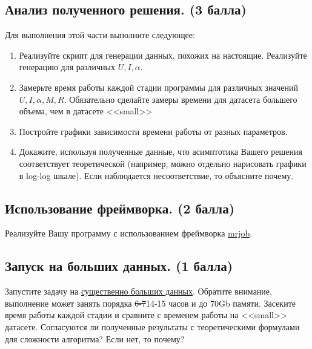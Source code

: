 \documentclass[11pt, fleqn]{article}
\begin{document}
\subsection{Анализ полученного решения. (3 балла)}
Для выполнения этой части выполните следующее:
\begin{enumerate}
	\item Реализуйте скрипт для генерации данных, похожих на настоящие. Реализуйте генерацию для различных $U, I, \alpha$.
	\item Замерьте время работы каждой стадии программы для различных значений $U, I, \alpha, M, R$. Обязательно сделайте замеры времени для датасета большего объема, чем в датасете <<small>>
	\item Постройте графики зависимости времени работы от разных параметров.
	\item Докажите, используя полученные данные, что асимптотика Вашего решения соответствует теоретической (например, можно отдельно нарисовать графики в log-log шкале). Если наблюдается несоответствие, то объясните почему.
\end{enumerate}
\subsection{Использование фреймворка. (2 балла)}
Реализуйте Вашу программу с использованием фреймворка \href{https://mrjob.readthedocs.io/en/latest/}{mrjob}.
\subsection{Запуск на больших данных. (1 балла)}
Запустите задачу на \href{https://grouplens.org/datasets/movielens/10m/}{существенно больших данных}. Обратите внимание, выполнение может занять порядка \sout{6-7}14-15 часов и до 70Gb памяти. Засеките время работы каждой стадии и сравните с временем работы на <<small>> датасете. Согласуются ли полученные результаты с теоретическими формулами для сложности алгоритма? Если нет, то почему?
\end{document}
